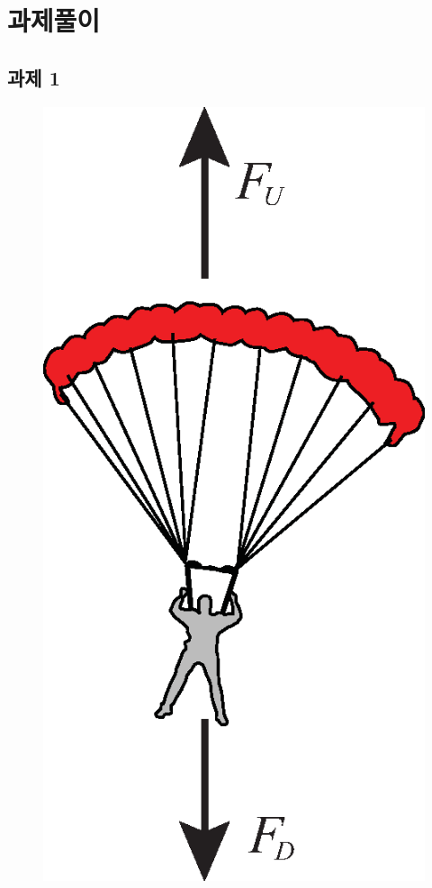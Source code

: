 \section{과제풀이}
\subsection{과제 1}
\begin{figure}[!hbpt]
\centering
\includegraphics[keepaspectratio=true,width=0.2\linewidth]{figs/parachute.eps}
\label{fig:b-2}
\end{figure}
